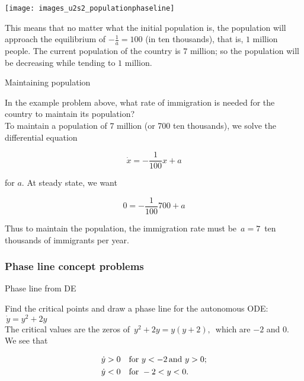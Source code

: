 \texttt{[image: images\_u2s2\_populationphaseline]}

This means that no matter what the initial population is,
the population will approach the equilibrium of $\displaystyle -\frac{1}{a} = 100$ (in ten thousands),
that is, $1$ million people.
The current population of the country is $7$ million;
so the population will be decreasing while tending to $1$ million. 

\begin{exercise}
  Maintaining population
\end{exercise}

In the example problem above, what rate of immigration is needed for
the country to maintain its population?\\

To maintain a population of $7$ million (or 700 ten thousands), we solve the differential equation

\begin{equation*}
  \dot x = - \frac{1}{100}x + a
\end{equation*}

for $a$.  At steady state, we want

\begin{equation*}
  0 = -\frac{1}{100} 700 + a
\end{equation*}

Thus to maintain the population, the immigration rate must be
$\, a = 7\,$ ten thousands of immigrants per year.

\clearpage

\subsubsection{Phase line concept problems}

\begin{exercise}
  Phase line from DE
\end{exercise}

Find the critical points and draw a phase line for the autonomous ODE:
$\, \dot y = y^2 + 2y \,$\\


The critical values are the zeros of $\, y^2 + 2y = y (y+2),\,$
which are $−2$ and $0$. We see that

\begin{align*}
  \displaystyle  \displaystyle & \dot{y}>0 \quad
                                 \displaystyle  \text {for}\, \,  y<-2 \, \text {and}\, \,  y>0; \\
  \displaystyle & \dot{y}<0 \quad
  \displaystyle \text {for}\, \,  -2<y<0.
\end{align*}


